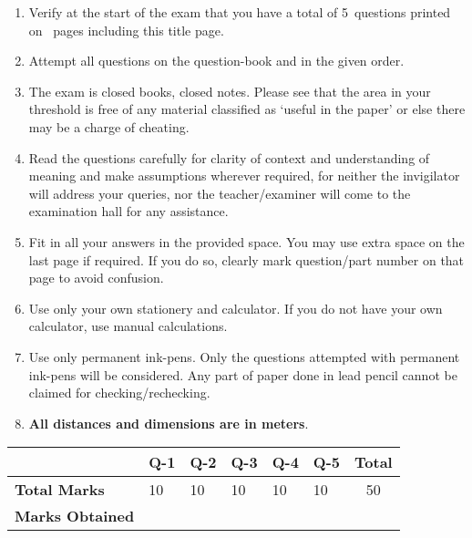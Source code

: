 \documentclass[12pt,a4paper]{article}
\newcommand\TotalMarks{50}
\newcommand\TotalQuestions{5}
\newcommand\TotalPages{\pageref{LastPage}} %
\def\Qone{10}
\def\Qtwo{10}
\def\Qthree{10}
\def\Qfour{10}
\def\Qfive{10}
\begin{document}
\begin{enumerate}
\itemsep0em
\item Verify at the start of the exam that you have a total of \TotalQuestions~questions printed on \TotalPages~pages including this title page.
\item Attempt all questions on the question-book and in the given order.
\item The exam is closed books, closed notes. Please see that the area in your threshold is free of any material classified as `useful in the paper' or else there may be a charge of cheating.
\item Read the questions carefully for clarity of context and understanding of meaning and make assumptions wherever required, for neither the invigilator will address your queries, nor the teacher/examiner will come to the examination hall for any assistance.
\item Fit in all your answers in the provided space. You may use extra space on the last page if required. If you do so, clearly mark question/part number on that page to avoid confusion. 
\item Use only your own stationery and calculator. If you do not have your own calculator, use manual calculations. 
\item Use only permanent ink-pens. Only the questions attempted with permanent ink-pens will be considered. Any part of paper done in lead pencil cannot be claimed for checking/rechecking.
\item \textbf{All distances and dimensions are in meters}.
\end{enumerate}
\begin{table}[H]
\begin{center}
\vspace{0.3cm}
	{\footnotesize \begin{tabular}{|C{1.8cm}|C{0.75cm}|C{0.75cm}|C{0.75cm}|C{0.75cm}|C{0.75cm}|c|}
	\hline
		\rule{0pt}{4.6ex} & Q-1 & Q-2 & Q-3 & Q-4 & Q-5 &\textbf{Total}\\[-0.5ex]
		\hline
		\rule{0pt}{2.5ex}\textbf{Total Marks}& \Qone & \Qtwo & \Qthree & \Qfour & \Qfive & \TotalMarks\\
		\hline
		\rule{0pt}{2.5ex}\textbf{Marks Obtained}& & & & & &\\
	\hline
	\end{tabular}}
\end{center}
\end{table}
\end{document}
